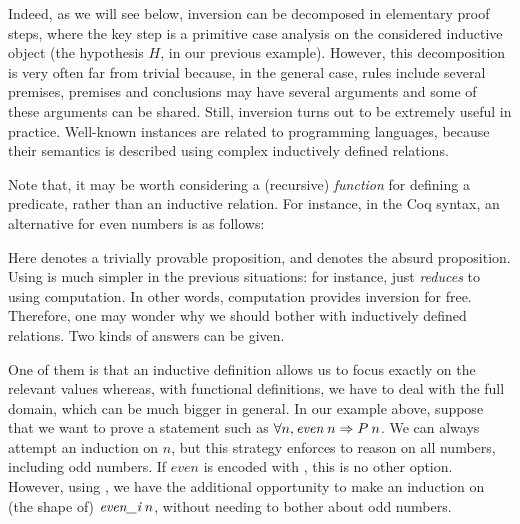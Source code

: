 Indeed, as we will see below, 
inversion can be decomposed in elementary proof steps,
where the key step is a primitive case analysis on the considered
inductive object (the hypothesis $H$, in our previous example). 
However, this decomposition is very often far from trivial because,
in the general case, rules include several premises,
premises and conclusions may have several arguments and
some of these arguments can be shared.
Still, inversion turns out to be extremely useful in practice.
Well-known instances are related to programming languages,
because their semantics is described using complex inductively defined
relations. 

Note that, it may be worth considering a (recursive) \emph{function}
for defining a predicate, rather than an inductive relation.
For instance, in the Coq syntax, an alternative for even
numbers is as follows:


\medskip
{}
\medskip

\noindent
Here  denotes a trivially provable proposition,
and  denotes the absurd proposition.
%
Using  is much simpler in the previous situations:
for instance,  just \emph{reduces} to
 using computation.
In other words, computation provides inversion for free.
Therefore, one may wonder why we should bother with inductively defined
relations.
Two kinds of answers can be given.

One of them is that an inductive definition allows us 
to focus exactly on the relevant values
whereas, with functional definitions, 
we have to deal with the full domain, 
which can be much bigger in general.
In our example above, 
suppose that we want to prove a statement such as
$\forall n, \mathit{even}\:n \Rightarrow P\: n$.
We can always attempt an induction on $n$, 
but this strategy enforces to reason on all numbers, 
including odd numbers.
If $\mathit{even}$ is encoded with ,
this is no other option.
However, using , 
we have the additional opportunity to make an induction on 
(the shape of) $\textit{even\_i}\;n$,
without needing to bother about odd numbers.

